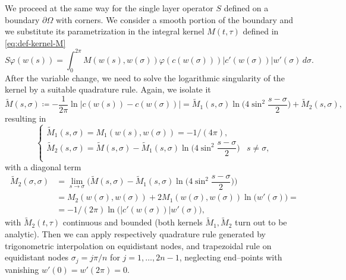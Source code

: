 \documentclass[10pt, a4paper, twoside, openright]{book}
\theoremstyle{definition}
\theoremstyle{plain}
\theoremstyle{plain}
\theoremstyle{plain}
\theoremstyle{plain}
\theoremstyle{plain}
\theoremstyle{plain}
\theoremstyle{plain}
\theoremstyle{plain}
\let\phi\varphi
\begin{document}
We proceed at the same way for the single layer operator $S$ defined on a boundary $\partial \Omega$ with corners. 
We consider a smooth portion of the boundary and we substitute its parametrization in the integral kernel $M(t,\tau)$ defined in \eqref{eq:def-kernel-M}
\begin{equation}
 S\phi(w(s))=\int_0^{2\pi}M(w(s),w(\sigma))\phi(c(w(\sigma)))|c'(w(\sigma))|w'(\sigma)\,d\sigma.
\end{equation}
After the variable change, we need to solve the logarithmic singularity of the kernel by a suitable quadrature rule. Again, we isolate it
\begin{equation}
\label{eq:def-kernel-tildeM}
 \tilde{M}(s,\sigma)\coloneqq-\frac{1}{2\pi}\ln|c(w(s))-c(w(\sigma))|=\tilde{M}_1(s,\sigma)\ln\Big(4\sin^2\frac{s - \sigma}{2}\Big)+\tilde{M}_2(s,\sigma),
\end{equation}
resulting in
\begin{equation}
\begin{cases}
 \tilde{M}_1(s,\sigma) = M_1(w(s),w(\sigma))= -1/(4\pi), \\
 \tilde{M}_2(s,\sigma) = \tilde{M}(s,\sigma) - \tilde{M}_1(s,\sigma)\ln\Big(4\sin^2\dfrac{s - \sigma}{2}\Big) & s\neq \sigma, \\
\end{cases}
\end{equation}
with a diagonal term
\begin{align}
 \tilde{M}_2(\sigma,\sigma)&=\lim_{s\to\sigma} \Big(\tilde{M}(s,\sigma) - \tilde{M}_1(s,\sigma)\ln\Big(4\sin^2\dfrac{s - \sigma}{2}\Big)\Big) \\
 &=M_2(w(\sigma),w(\sigma)) + 2M_1(w(\sigma),w(\sigma))\ln\big(w'(\sigma)\big)= \\
 &=-1/(2\pi)\ln\big(|c'(w(\sigma))|w'(\sigma)\big),
\end{align}
with $\tilde{M}_2(t,\tau)$ continuous and bounded (both kernels $\tilde{M}_1, \tilde{M}_2$ turn out to be analytic). 
Then we can apply respectively quadrature rule generated by trigonometric interpolation on equidistant nodes, and trapezoidal rule on equidistant nodes $\sigma_j = j\pi/n$ for $j=1,\dots,2n-1$, neglecting end--points with vanishing $w'(0)=w'(2\pi)=0$.
\end{document}

